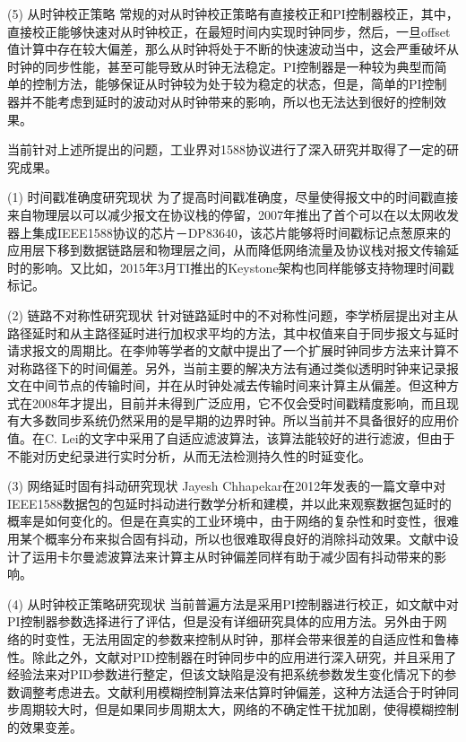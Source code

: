 (5) 从时钟校正策略
常规的对从时钟校正策略有直接校正和PI控制器校正，其中，直接校正能够快速对从时钟校正，在最短时间内实现时钟同步，然后，一旦offset值计算中存在较大偏差，那么从时钟将处于不断的快速波动当中，这会严重破坏从时钟的同步性能，甚至可能导致从时钟无法稳定。PI控制器是一种较为典型而简单的控制方法，能够保证从时钟较为处于较为稳定的状态，但是，简单的PI控制器并不能考虑到延时的波动对从时钟带来的影响，所以也无法达到很好的控制效果。

当前针对上述所提出的问题，工业界对1588协议进行了深入研究并取得了一定的研究成果。

(1) 时间戳准确度研究现状
为了提高时间戳准确度，尽量使得报文中的时间戳直接来自物理层以可以减少报文在协议栈的停留，2007年推出了首个可以在以太网收发器上集成IEEE1588协议的芯片－DP83640\supercite{4}，该芯片能够将时间戳标记点葱原来的应用层下移到数据链路层和物理层之间，从而降低网络流量及协议栈对报文传输延时的影响。又比如，2015年3月TI推出的Keystone架构也同样能够支持物理时间戳标记\supercite{5}。

(2) 链路不对称性研究现状
针对链路延时中的不对称性问题，李学桥层提出对主从路径延时和从主路径延时进行加权求平均的方法，其中权值来自于同步报文与延时请求报文的周期比\supercite{6}。在李帅等学者的文献\parencite{7}中提出了一个扩展时钟同步方法来计算不对称路径下的时间偏差。另外，当前主要的解决方法有通过类似透明时钟来记录报文在中间节点的传输时间，并在从时钟处减去传输时间来计算主从偏差。但这种方式在2008年才提出，目前并未得到广泛应用，它不仅会受时间戳精度影响，而且现有大多数同步系统仍然采用的是早期的边界时钟。所以当前并不具备很好的应用价值。在C. Lei的文字\supercite{57}中采用了自适应滤波算法，该算法能较好的进行滤波，但由于不能对历史纪录进行实时分析，从而无法检测持久性的时延变化。

(3) 网络延时固有抖动研究现状
Jayesh Chhapekar在2012年发表的一篇文章中对IEEE1588数据包的包延时抖动进行数学分析和建模，并以此来观察数据包延时的概率是如何变化的\supercite{8}。但是在真实的工业环境中，由于网络的复杂性和时变性，很难用某个概率分布来拟合固有抖动，所以也很难取得良好的消除抖动效果。文献\parencite{9}中设计了运用卡尔曼滤波算法来计算主从时钟偏差同样有助于减少固有抖动带来的影响。

(4) 从时钟校正策略研究现状
当前普遍方法是采用PI控制器进行校正，如文献\parencite{10}中对PI控制器参数选择进行了评估，但是没有详细研究具体的应用方法。另外由于网络的时变性，无法用固定的参数来控制从时钟，那样会带来很差的自适应性和鲁棒性。除此之外，文献\parencite{11}对PID控制器在时钟同步中的应用进行深入研究，并且采用了经验法来对PID参数进行整定，但该文缺陷是没有把系统参数发生变化情况下的参数调整考虑进去。文献\parencite{12}利用模糊控制算法来估算时钟偏差，这种方法适合于时钟同步周期较大时，但是如果同步周期太大，网络的不确定性干扰加剧，使得模糊控制的效果变差。

